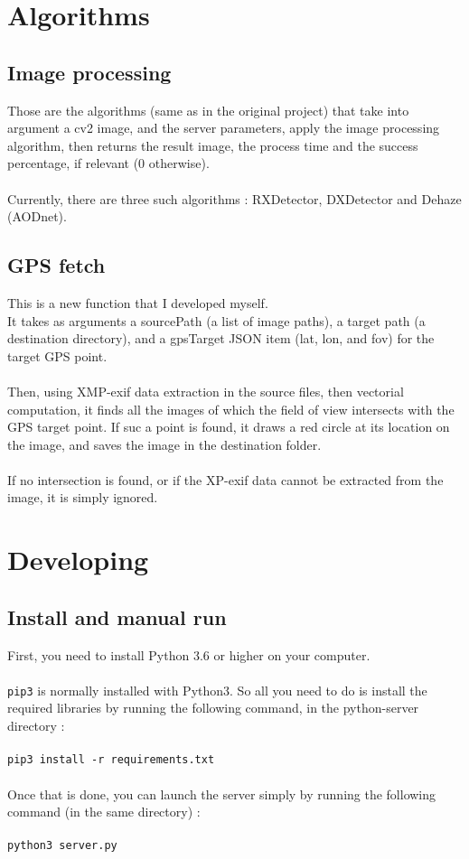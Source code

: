 \documentclass[12pt,a4paper]{article}
\begin{document}
\section{Algorithms}

\subsection{Image processing}

Those are the algorithms (same as in the original project) that take into argument a cv2 image, and the server parameters, apply the image processing algorithm, then returns the result image, the process time and the success percentage, if relevant (0 otherwise).\\
~\\
Currently, there are three such algorithms : RXDetector, DXDetector and Dehaze (AODnet).

\subsection{GPS fetch}
This is a new function that I developed myself.\\
It takes as arguments a sourcePath (a list of image paths), a target path (a destination directory), and a gpsTarget JSON item (lat, lon, and fov) for the target GPS point.\\
~\\
Then, using XMP-exif data extraction in the source files, then vectorial computation, it finds all the images of which the field of view intersects with the GPS target point. If suc a point is found, it draws a red circle at its location on the image, and saves the image in the destination folder.\\
~\\
If no intersection is found, or if the XP-exif data cannot be extracted from the image, it is simply ignored.

\section{Developing}
\subsection{Install and manual run}
First, you need to install Python 3.6 or higher on your computer.\\
~\\
\texttt{pip3} is normally installed with Python3. So all you need to do is install the required libraries by running the following command, in the python-server directory :\\
~\\
\texttt{pip3 install -r requirements.txt}\\
~\\
Once that is done, you can launch the server simply by running the following command (in the same directory) :\\
~\\
\texttt{python3 server.py}
\end{document}
